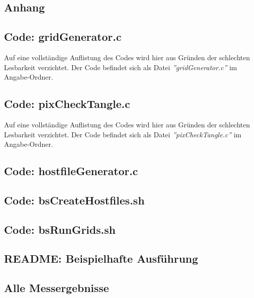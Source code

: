 \documentclass[
10pt, %
a4paper, %
oneside, %
headinclude,footinclude, %
BCOR5mm, %
]{scrartcl}
\begin{document}
\begin{appendix} 
	\clearpage 
	\section{Anhang}
	\subsection{Code: gridGenerator.c}
	Auf eine vollständige Auflistung des Codes wird hier aus Gründen der schlechten Lesbarkeit verzichtet. Der Code befindet sich als Datei \textit{''gridGenerator.c'' }im Angabe-Ordner.
	
	\subsection{Code: pixCheckTangle.c}
	Auf eine vollständige Auflistung des Codes wird hier aus Gründen der schlechten Lesbarkeit verzichtet. Der Code befindet sich als Datei \textit{''pixCheckTangle.c'' }im Angabe-Ordner.

	\subsection{Code: hostfileGenerator.c}

	
	
	\subsection{Code: bsCreateHostfiles.sh}			
	
	
	
	\subsection{Code: bsRunGrids.sh}
	
	

	\subsection{README: Beispielhafte Ausführung}
	
	
	
	\subsection{Alle Messergebnisse}


\end{appendix}
\end{document}
